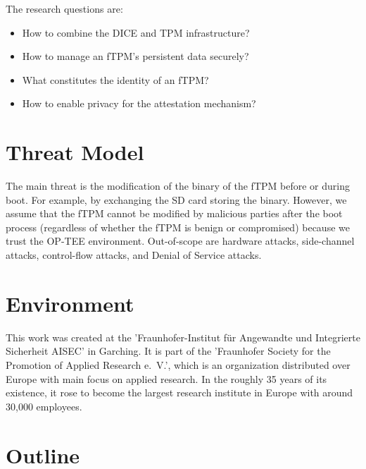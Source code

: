 The research questions are:
\begin{itemize}
  \item How to combine the DICE and TPM infrastructure? %
  \item How to manage an fTPM's persistent data securely? %
  \item What constitutes the identity of an fTPM? %
  \item How to enable privacy for the attestation mechanism?
\end{itemize}



\section{Threat Model}

The main threat is the modification of the binary of the fTPM before or during boot. For example, by exchanging the SD card storing the binary.
However, we assume that the fTPM cannot be modified by malicious parties after the boot process (regardless of whether the fTPM is benign or compromised) because we trust the OP-TEE environment.
Out-of-scope are hardware attacks, side-channel attacks, control-flow attacks, and Denial of Service attacks.



\section{Environment}

This work was created at the 'Fraunhofer-Institut für Angewandte und Integrierte Sicherheit AISEC' in Garching.
It is part of the 'Fraunhofer Society for the Promotion of Applied Research e.~V.', which is an organization distributed over Europe with main focus on applied research.
In the roughly 35 years of its existence, it rose to become the largest research institute in Europe with around 30,000 employees.

\section{Outline}

